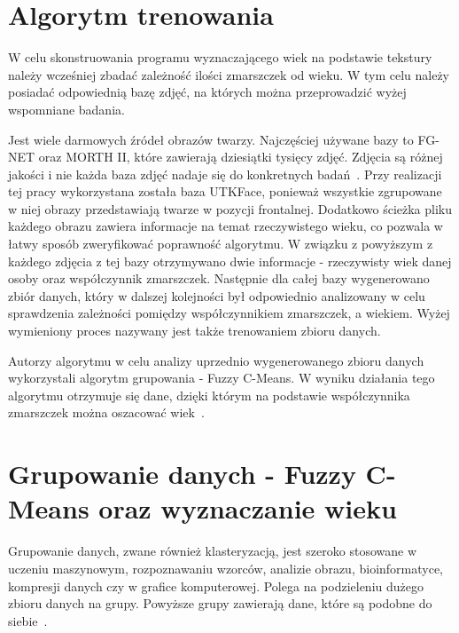 \documentclass[a4paper,twoside,12pt]{book}
\begin{document}
    \section{Algorytm trenowania}\label{sec:algorytmTrenowania}
    W celu skonstruowania programu wyznaczającego wiek na podstawie tekstury należy wcześniej zbadać zależność ilości
    zmarszczek od wieku.
    W tym celu należy posiadać odpowiednią bazę zdjęć, na których można przeprowadzić wyżej wspomniane badania.

    Jest wiele darmowych źródeł obrazów twarzy.
    Najczęściej używane bazy to FG-NET oraz MORTH II, które
    zawierają dziesiątki tysięcy zdjęć.
    Zdjęcia są różnej jakości i nie każda baza zdjęć nadaje się do konkretnych badań~\cite{khryashchevGanin}.
    Przy realizacji tej pracy wykorzystana została baza UTKFace,
    ponieważ wszystkie zgrupowane w niej obrazy przedstawiają twarze w pozycji frontalnej. Dodatkowo
    ścieżka pliku każdego obrazu zawiera informacje na temat rzeczywistego wieku, co pozwala w łatwy sposób
    zweryfikować poprawność algorytmu.
    W związku z powyższym z każdego zdjęcia z tej bazy otrzymywano dwie informacje - rzeczywisty wiek danej osoby oraz
    współczynnik zmarszczek.
    Następnie dla całej bazy wygenerowano zbiór danych, który w dalszej kolejności był odpowiednio analizowany w celu
    sprawdzenia zależności pomiędzy współczynnikiem zmarszczek, a wiekiem. Wyżej wymieniony proces nazywany jest
    także trenowaniem zbioru danych.

    Autorzy algorytmu w celu analizy uprzednio wygenerowanego zbioru danych wykorzystali algorytm grupowania -
    Fuzzy C-Means.
    W wyniku działania tego algorytmu otrzymuje się dane, dzięki którym na podstawie współczynnika zmarszczek można
    oszacować wiek~\cite{wrinkleFeatures}.
    \section{Grupowanie danych - Fuzzy C-Means oraz wyznaczanie wieku}\label{sec:grupowanieDanych}
    Grupowanie danych, zwane również klasteryzacją, jest szeroko stosowane w uczeniu maszynowym, rozpoznawaniu wzorców,
    analizie obrazu, bioinformatyce, kompresji danych czy w grafice komputerowej.
    Polega na podzieleniu dużego zbioru danych na grupy.
    Powyższe grupy zawierają dane, które są podobne do siebie~\cite{clusterWstep}.
\end{document}
